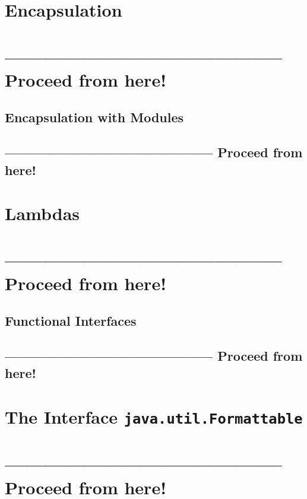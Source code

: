 \documentclass[11pt,a4paper, titlepage, parskip=half, headsepline, footsepline, cleardoublepage=current, headheight=1cm]{scrbook}
\begin{document}
\section{Encapsulation}
\section{-------------------------------------------- Proceed from here!}
\lipsum[5]

\subsection{Encapsulation with Modules}\label{sec:EncapsulationWithModules}
\subsection{-------------------------------------------- Proceed from here!}
\lipsum[5]

\section{Lambdas}\label{sec:Lambdas}
\section{-------------------------------------------- Proceed from here!}
\lipsum[5]

\subsection{Functional Interfaces}\label{sec:FunctionalInterfaces}
\subsection{-------------------------------------------- Proceed from here!}
\lipsum[5]

\section{The Interface \lstinline|java.util.Formattable|}\label{sec:FormattableInterface}
\section{-------------------------------------------- Proceed from here!}

\autocite{ORACLE_DOC_STRING_CLASS}
\autocite{ORACLE_DOC_STRINGBUFFER_CLASS}
\autocite{ORACLE_DOC_STRINGBUILDER_CLASS}
\autocite{ORACLE_DOC_STRINGJOINER_CLASS}
\autocite{ORACLE_DOC_FORMATTER_CLASS}
\autocite{ORACLE_DOC_FORMATTABLE_INTERFACE}
\end{document}
